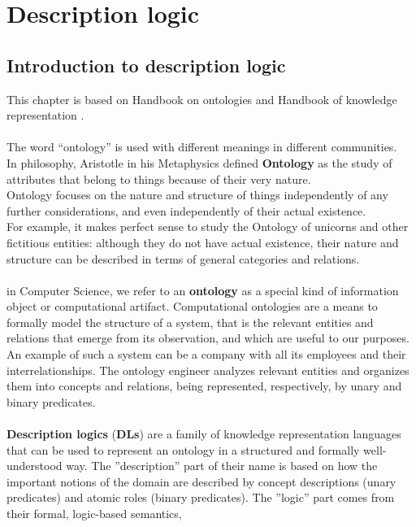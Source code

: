\chapter{Description logic}\label{chap:Desc}

\section{Introduction to description logic}

This chapter is based on Handbook on ontologies \cite{handbook} and Handbook of knowledge representation \cite{handbook2}.
\\ \\
The word ``ontology'' is used with different meanings in different communities.  \\
In philosophy, Aristotle in his Metaphysics defined \textbf{Ontology} as the study of attributes that belong to things because of their very nature.\\ Ontology focuses on the
nature and structure of things independently of any further considerations,
and even independently of their actual existence.\\ For example, it makes
perfect sense to study the Ontology of unicorns and other fictitious entities:
although they do not have actual existence, their nature and structure can be
described in terms of general categories and relations.
\\ \\
in Computer Science, we refer to an \textbf{ontology} as a special kind of information object or
computational artifact. Computational ontologies are a means to formally model the structure
of a system, that is the relevant entities and relations that emerge from its
observation, and which are useful to our purposes. An example of such a
system can be a company with all its employees and their interrelationships.
The ontology engineer analyzes relevant entities and organizes them into concepts
and relations, being represented, respectively, by unary and binary predicates.
\\ \\
\textbf{Description logics} (\textbf{DLs}) are a family of knowledge representation
languages that can be used to represent an ontology
in a structured and formally well-understood way. The ''description'' part of their name is based on how the important notions of the domain
are described by concept descriptions (unary predicates) and atomic roles (binary predicates). The ''logic'' part comes from their formal, logic-based semantics,
